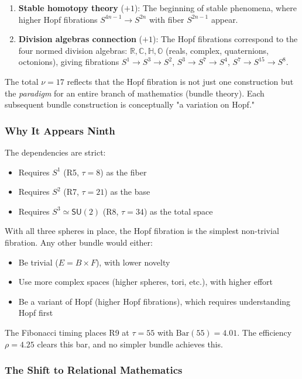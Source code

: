 \documentclass[11pt]{article}
\theoremstyle{definition}
\begin{document}
\begin{enumerate}
\item \textbf{Stable homotopy theory} ($+1$): The beginning of stable phenomena, where higher Hopf fibrations $S^{4n-1} \to S^{2n}$ with fiber $S^{2n-1}$ appear.

\item \textbf{Division algebras connection} ($+1$): The Hopf fibrations correspond to the four normed division algebras: $\mathbb{R}, \mathbb{C}, \mathbb{H}, \mathbb{O}$ (reals, complex, quaternions, octonions), giving fibrations $S^1 \to S^3 \to S^2$, $S^3 \to S^7 \to S^4$, $S^7 \to S^{15} \to S^8$.
\end{enumerate}

The total $\nu=17$ reflects that the Hopf fibration is not just one construction but the \emph{paradigm} for an entire branch of mathematics (bundle theory). Each subsequent bundle construction is conceptually "a variation on Hopf."

\subsubsection{Why It Appears Ninth}

The dependencies are strict:
\begin{itemize}
\item Requires $S^1$ (R5, $\tau=8$) as the fiber
\item Requires $S^2$ (R7, $\tau=21$) as the base
\item Requires $S^3 \simeq \mathsf{SU}(2)$ (R8, $\tau=34$) as the total space
\end{itemize}

With all three spheres in place, the Hopf fibration is the simplest non-trivial fibration. Any other bundle would either:
\begin{itemize}
\item Be trivial ($E = B \times F$), with lower novelty
\item Use more complex spaces (higher spheres, tori, etc.), with higher effort
\item Be a variant of Hopf (higher Hopf fibrations), which requires understanding Hopf first
\end{itemize}

The Fibonacci timing places R9 at $\tau=55$ with $\text{Bar}(55) = 4.01$. The efficiency $\rho=4.25$ clears this bar, and no simpler bundle achieves this.

\subsubsection{The Shift to Relational Mathematics}
\end{document}
